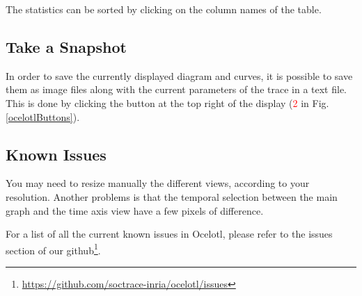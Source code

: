 \documentclass[twoside]{article}
\begin{document}
\begin{sloppypar}
The statistics can be sorted by clicking on the column names of the table.

\subsection{Take a Snapshot}
In order to save the currently displayed diagram and curves, it is possible to save them as image files along with the current parameters of the trace in a text file. This is done by clicking the button at the top right of the display (\textcolor{red}{2} in Fig. \ref{ocelotlButtons}).

\subsection{Known Issues}
You may need to resize manually the different views, according to your resolution. Another problems is that the temporal selection between the main graph and the time axis view have a few pixels of difference.

For a list of all the current known issues in Ocelotl, please refer to the issues section of our github\footnote{\url{https://github.com/soctrace-inria/ocelotl/issues}}.

\newpage

\newpage

{}

\end{sloppypar} 
\end{document}
